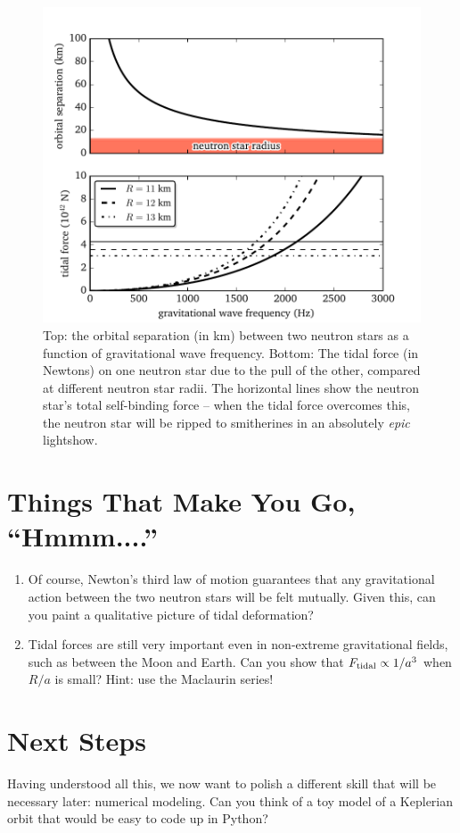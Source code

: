\documentclass[11pt]{article}
\begin{document}
\begin{figure}
\centering
\includegraphics[scale=1]{newtonian_tidal_forces.pdf}
\caption{\label{fig:NS_tides}Top: the orbital separation (in km) between two neutron stars as a function of gravitational wave frequency. Bottom: The tidal force (in Newtons) on one neutron star due to the pull of the other, compared at different neutron star radii. The horizontal lines show the neutron star's total self-binding force -- when the tidal force overcomes this, the neutron star will be ripped to smitherines in an absolutely \emph{epic} lightshow.}
\end{figure}

\section*{Things That Make You Go, ``Hmmm....''}

\begin{enumerate}

\item Of course, Newton's third law of motion guarantees that any gravitational action between the two neutron stars will be felt mutually. Given this, can you paint a qualitative picture of tidal deformation?

\item Tidal forces are still very important even in non-extreme gravitational fields, such as between the Moon and Earth. Can you show that $F_{\rm tidal} \propto 1/a^3$ when $R/a$ is small? Hint: use the Maclaurin series!

\end{enumerate}

\section*{Next Steps}

\hspace{15pt} Having understood all this, we now want to polish a different skill that will be necessary later: numerical modeling. Can you think of a toy model of a Keplerian orbit that would be easy to code up in Python?
\end{document}
